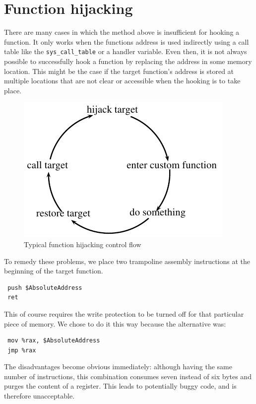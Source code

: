 \section{Function hijacking} \label{sec:hij}

There are many cases in which the method above is insufficient for hooking a 
function. It only works when the functions address is used indirectly using a 
call table like the \verb+sys_call_table+ or a handler variable. Even then, it 
is not always possible to successfully hook a function by replacing the address 
in some memory location. This might be the case if the target function's 
address is stored at multiple locations that are not clear or accessible when 
the hooking is to take place.\\
\begin{figure}[h!]
\centering
 \includegraphics{control_flow}
 \caption{Typical function hijacking control flow}
 \label{fig:control}
\end{figure}
To remedy these problems, we place two trampoline assembly instructions at the 
beginning of the target function.
\lstset{style=customasm}
\begin{lstlisting}
 push $AbsoluteAddress
 ret
\end{lstlisting}
This of course requires the write protection to be turned off for that 
particular piece of memory. We chose to do it this way because the alternative 
was:
\begin{lstlisting}
 mov %rax, $AbsoluteAddress
 jmp %rax
\end{lstlisting}
The disadvantages become obvious immediately: although having the same number 
of instructions, this combination consumes seven instead of six bytes and 
purges the content of a register. This leads to potentially 
buggy code, and is therefore unacceptable.\newline
